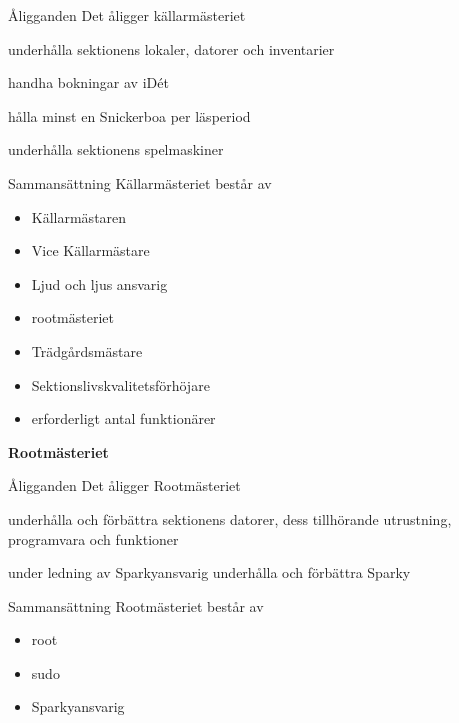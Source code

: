 \documentclass[pdfbookmarks,a4paper,11pt]{article}
\newlength{\itemcollength}
\newenvironment{reglemlista}{%
  \begin{list}{}{%
      \setlength{\labelwidth}{\itemcollength}%
      \setlength{\leftmargin}{\labelwidth + \labelsep}%
      \renewcommand{\makelabel}[1]{%
        \raisebox{0pt}[1ex][0pt]{%
          \makebox[\labelwidth][l]{%
            \parbox[t]{\itemcollength}{%
              \raggedright\hspace{0pt}##1}}}\hfill}%
      }}{%
  \end{list}}
\begin{document}
\begin{reglemlista}

  \item[Åligganden]
    Det åligger källarmästeriet
    \begin{attlista}
      \item underhålla sektionens lokaler, datorer och inventarier
      \item handha bokningar av iDét
      \item hålla minst en Snickerboa per läsperiod
      \item underhålla sektionens spelmaskiner
    \end{attlista}


  \item[Sammansättning]
    Källarmästeriet består av
    \begin{itemize}
      \item Källarmästaren
      \item Vice Källarmästare
      \item Ljud och ljus ansvarig
      \item rootmästeriet
      \item Trädgårdsmästare
      \item Sektionslivskvalitetsförhöjare
      \item erforderligt antal funktionärer
    \end{itemize}
   
  \item[\textbf{Rootmästeriet}]
  	
  	\item[Åligganden]
  		Det åligger Rootmästeriet
  		\begin{attlista}
  			\item underhålla och förbättra sektionens datorer, dess tillhörande utrustning, programvara och funktioner
  			\item under ledning av Sparkyansvarig underhålla och förbättra Sparky
  		\end{attlista}
  	
	\item[Sammansättning]
		Rootmästeriet består av
		\begin{itemize}
			\item root
			\item sudo
			\item Sparkyansvarig
		\end{itemize}
	
\end{reglemlista}
\end{document}
